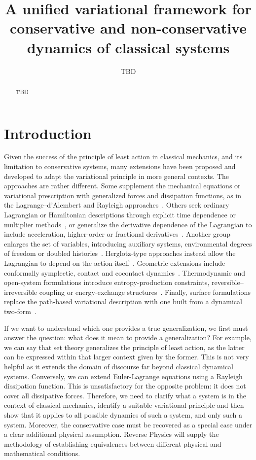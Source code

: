 \documentclass[12pt]{article}
\title{A unified variational framework for conservative and non-conservative dynamics of classical systems}
\author{TBD }
\begin{document}
\maketitle

\begin{abstract}
    TBD
\end{abstract}

\section{Introduction}

Given the success of the principle of least action in classical mechanics, and its limitation to conservative systems, many extensions have been proposed and developed to adapt the variational principle in more general contexts. The approaches are rather different. Some supplement the mechanical equations or variational prescription with generalized forces and dissipation functions, as in the Lagrange--d'Alembert and Rayleigh approaches~\cite{gaybalmaz,minguzzi}. Others seek ordinary Lagrangian or Hamiltonian descriptions through explicit time dependence or multiplier methods~\cite{kanai,nuccitamizhmani}, or generalize the derivative dependence of the Lagrangian to include acceleration, higher-order or fractional derivatives~\cite{paisuhlenbeck,riewe,almeidamalinowska}. Another group enlarges the set of variables, introducing auxiliary systems, environmental degrees of freedom or doubled histories~\cite{bateman,caldeiraleggett,galley,galleytsangstein,martindiego}. Herglotz-type approaches instead allow the Lagrangian to depend on the action itself~\cite{lazo,almeidamalinowska}. Geometric extensions include conformally symplectic, contact and cocontact dynamics~\cite{mclachlan,bravetti,cocontact}. Thermodynamic and open-system formulations introduce entropy-production constraints, reversible--irreversible coupling or energy-exchange structures~\cite{gaybalmaz,gaybalmazopen,generic,porthamiltonian}. Finally, surface formulations replace the path-based variational description with one built from a dynamical two-form~\cite{kochanstrings,kochan}.

If we want to understand which one provides a true generalization, we first must answer the question: what does it mean to provide a generalization? For example, we can say that set theory generalizes the principle of least action, as the latter can be expressed within that larger context given by the former. This is not very helpful as it extends the domain of discourse far beyond classical dynamical systems. Conversely, we can extend Euler-Lagrange equations using a Rayleigh dissipation function. This is unsatisfactory for the opposite problem: it does not cover all dissipative forces. Therefore, we need to clarify what a system is in the context of classical mechanics, identify a suitable variational principle and then show that it applies to all possible dynamics of such a system, and only such a system. Moreover, the conservative case must be recovered as a special case under a clear additional physical assumption. Reverse Physics will supply the methodology of establishing equivalences between different physical and mathematical conditions.
\end{document}
